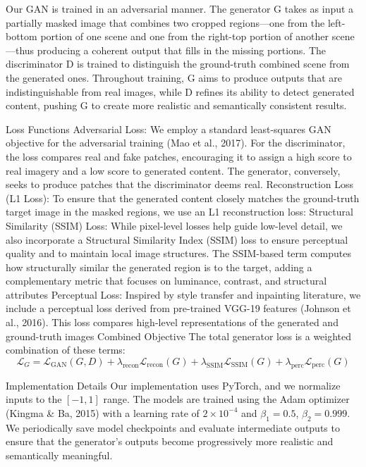 \documentclass[sigconf]{acmart}
\begin{document}
Our GAN is trained in an adversarial manner. The generator G takes as input a partially masked image that combines two cropped regions—one from the left-bottom portion of one scene and one from the right-top portion of another scene—thus producing a coherent output that fills in the missing portions. The discriminator D is trained to distinguish the ground-truth combined scene from the generated ones. Throughout training, G aims to produce outputs that are indistinguishable from real images, while D refines its ability to detect generated content, pushing G to create more realistic and semantically consistent results.

Loss Functions
Adversarial Loss:
We employ a standard least-squares GAN objective for the adversarial training (Mao et al., 2017). For the discriminator, the loss compares real and fake patches, encouraging it to assign a high score to real imagery and a low score to generated content. The generator, conversely, seeks to produce patches that the discriminator deems real.
Reconstruction Loss (L1 Loss):
To ensure that the generated content closely matches the ground-truth target image in the masked regions, we use an L1 reconstruction loss:
Structural Similarity (SSIM) Loss:
While pixel-level losses help guide low-level detail, we also incorporate a Structural Similarity Index (SSIM) loss to ensure perceptual quality and to maintain local image structures. The SSIM-based term computes how structurally similar the generated region is to the target, adding a complementary metric that focuses on luminance, contrast, and structural attributes
Perceptual Loss:
Inspired by style transfer and inpainting literature, we include a perceptual loss derived from pre-trained VGG-19 features (Johnson et al., 2016). This loss compares high-level representations of the generated and ground-truth images
Combined Objective
The total generator loss is a weighted combination of these terms:
\[
\mathcal{L}_{G} = \mathcal{L}_{\text{GAN}}(G,D) + \lambda_{\text{recon}}\mathcal{L}_{\text{recon}}(G) + \lambda_{\text{SSIM}}\mathcal{L}_{\text{SSIM}}(G) + \lambda_{\text{perc}}\mathcal{L}_{\text{perc}}(G)
\]

Implementation Details
Our implementation uses PyTorch, and we normalize inputs to the $[-1, 1]$ range. The models are trained using the Adam optimizer (Kingma \& Ba, 2015) with a learning rate of $2 \times 10^{-4}$ and $\beta_1 = 0.5$, $\beta_2 = 0.999$. We periodically save model checkpoints and evaluate intermediate outputs to ensure that the generator’s outputs become progressively more realistic and semantically meaningful.
\end{document}

